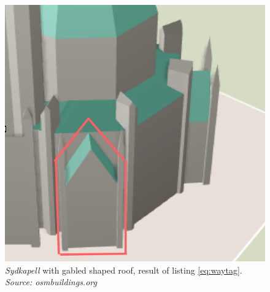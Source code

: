 \begin{figure}[H]
    \centering
    \includegraphics[scale=0.5]{figures/FixedByMe/nidaros3D.png}
    \caption{\textit{Sydkapell} with gabled shaped roof, result of listing \ref{eq:waytag}. \textit{Source: osmbuildings.org}}
    \label{fig:erkeinng}
\end{figure} 